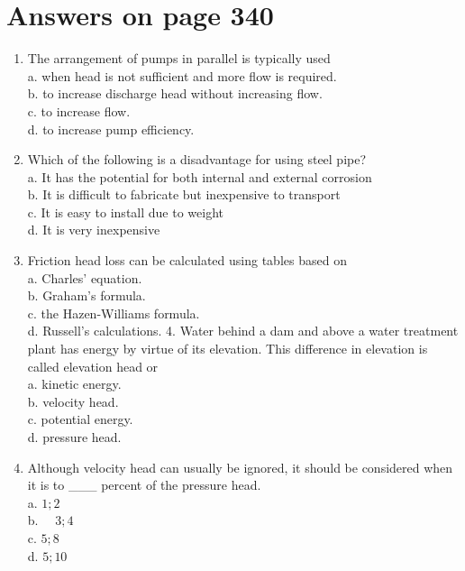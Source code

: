 \documentclass[10pt]{article}
\begin{document}
\section{Answers on page 340}
\begin{enumerate}
  \item The arrangement of pumps in parallel is typically used\\
a. when head is not sufficient and more flow is required.\\
b. to increase discharge head without increasing flow.\\
c. to increase flow.\\
d. to increase pump efficiency.

  \item Which of the following is a disadvantage for using steel pipe?\\
a. It has the potential for both internal and external corrosion\\
b. It is difficult to fabricate but inexpensive to transport\\
c. It is easy to install due to weight\\
d. It is very inexpensive

  \item Friction head loss can be calculated using tables based on\\
a. Charles' equation.\\
b. Graham's formula.\\
c. the Hazen-Williams formula.\\
d. Russell's calculations. 4. Water behind a dam and above a water treatment plant has energy by virtue of its elevation. This difference in elevation is called elevation head or\\
a. kinetic energy.\\
b. velocity head.\\
c. potential energy.\\
d. pressure head.

  \item Although velocity head can usually be ignored, it should be considered when it is to \_\_\_ percent of the pressure head.\\
a. $1 ; 2$\\
b. $\quad 3 ; 4$\\
c. $5 ; 8$\\
d. $5 ; 10$

\end{enumerate}
\end{document}
